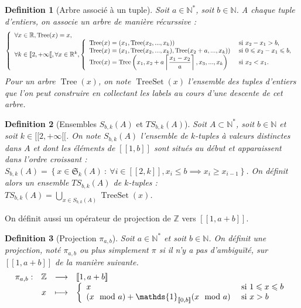 \documentclass{article}
\newtheorem{definition}{Definition}[section]
\DeclareMathOperator{\tree}{Tree}
\DeclareMathOperator{\treeset}{TreeSet}
\newcommand{\TS}{\mathit{TS}}
\begin{document}
\begin{definition}[Arbre associé à un tuple]
Soit \(a \in \mathbb{N}^*\), soit \(b \in \mathbb{N}\). A chaque tuple d'entiers, on associe un arbre de manière récurssive :
\[ \left\{
\begin{array}{l}
	\forall x \in \mathbb{R}, \tree(x) = x, \\
	\forall k \in [\![2, +\infty[\![, \forall x \in \mathbb{R}^k,
		\left\{
		\begin{array}{l l}
			\tree(x) = (x_1, \tree(x_2, ..., x_k)) &  ~\text{si}~ x_2 - x_1 > b, \\
			\tree(x) = (x_1, \tree(x_2, ..., x_k), \tree(x_2 + a, ..., x_k)) &  ~\text{si}~ 0 \leqslant x_2 - x_1 \leqslant b, \\
			\tree(x) = \tree\left(x_1, x_2 + a \left\lceil \dfrac{x_1 - x_2}{a}\right\rceil, x_3, ..., x_k\right) & ~\text{si}~ x_2 < x_1.
		\end{array}
		\right.
\end{array}
\right. \]
Pour un arbre \(\tree(x)\), on note \(\treeset(x)\) l'ensemble des tuples d'entiers que l'on peut construire en collectant les labels au cours d'une descente de cet arbre.
\end{definition}

\begin{definition}[Ensembles \(S_{b,k}(A)\) et \(\TS_{b,k}(A)\)]
Soit \(A \subset \mathbb{N}^*\), soit \(b \in \mathbb{N}\) et soit \(k \in [\![2, +\infty[\![\). On note \(S_{b,k}(A)\) l'ensemble de \(k\)-tuples  à valeurs distinctes dans \(A\) et dont les éléments de \([\![1, b]\!]\) sont situés au début et apparaissent dans l'ordre croissant :\\
\(S_{b,k}(A) = \left\{ x \in \mathfrak{S}_k(A) ~:~ \forall i \in  [\![2, k]\!], x_i \leqslant b \implies x_i \geqslant x_{i -1} \right\}\). On définit alors un ensemble \(\TS_{b,k}(A)\) de \(k\)-tuples : \(\TS_{b,k}(A) = \displaystyle\bigcup\limits_{x \in S_{b,k}(A)} \treeset(x)\).
\end{definition}

On définit aussi un opérateur de projection de \(\mathbb{Z}\) vers \([\![1, a + b]\!]\).

\begin{definition}[Projection \(\pi_{a, b}\)]
Soit \(a \in \mathbb{N}^*\) et soit \(b \in \mathbb{N}\). On définit une projection, noté \(\pi_{a, b}\) ou plus simplement \(\pi\) si il n'y a pas d'ambiguïté, sur \([\![1, a + b]\!]\) de la manière suivante.
\[ \begin{array}{c c c l}
	\pi_{a, b} : & \mathbb{Z} & \longrightarrow & [\![1, a + b]\!] \\
	 & x & \longmapsto & 
		\left\{
		\begin{array}{l l}
			x & ~\text{si}~ 1 \leqslant x \leqslant b \\
			(x \mod a) + \mathds{1}_{[\![0, b]\!]}(x \mod a) & ~\text{si}~ x > b
		\end{array}
		\right.
\end{array} \]
\end{definition}
\end{document}
